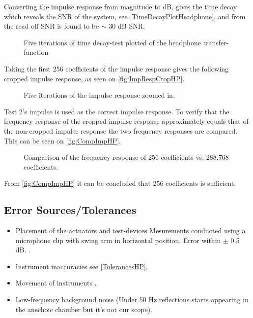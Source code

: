 Converting the impulse response from magnitude to dB, gives the time decay which reveals the SNR  of the system, see \autoref{TimeDecayPlotHeadphone}, and from the read off SNR is found to be $\sim$ 30 dB SNR.

\begin{figure}[H]
	\centering
	
	\caption{Five iterations of time decay-test plotted of the headphone transfer-function}
	\label{TimeDecayPlotHeadphone}
\end{figure}

Taking the first 256 coefficients of the impulse response gives the following cropped impulse response, as seen on \autoref{fig:ImpRespCropHP}.

\begin{figure}[H]
	\centering
	
	\caption{Five iterations of the impulse response zoomed in.}
	\label{fig:ImpRespCropHP}
\end{figure}

Test 2's impulse is used as the correct impulse response. To verify that the frequency response of the cropped impulse response approximately equals that of the non-cropped impulse response the two frequency responses are compared. This can be seen on \autoref{fig:CompImpHP}.

\begin{figure}[H]
	\centering
	
	\caption{Comparison of the frequency response of 256 coefficients vs. 288,768 coefficients.}
	\label{fig:CompImpHP}
\end{figure}

From \autoref{fig:CompImpHP} it can be concluded that 256 coefficients is sufficient.


\subsection{Error Sources/Tolerances}
\begin{itemize}
	\item Placement of the actuators and test-devices Mesurements conducted using a microphone clip with swing arm in horizontal position. Error within $\pm$ 0.5 dB. \citep{BK1985}.	
	\item Instrument inaccuracies see \autoref{TolerancesHP}.
	\item Movement of instruments .
	\item Low-frequency background noise (Under 50 Hz reflections starts appearing in the anechoic chamber but it's not our scope).
\end{itemize}

